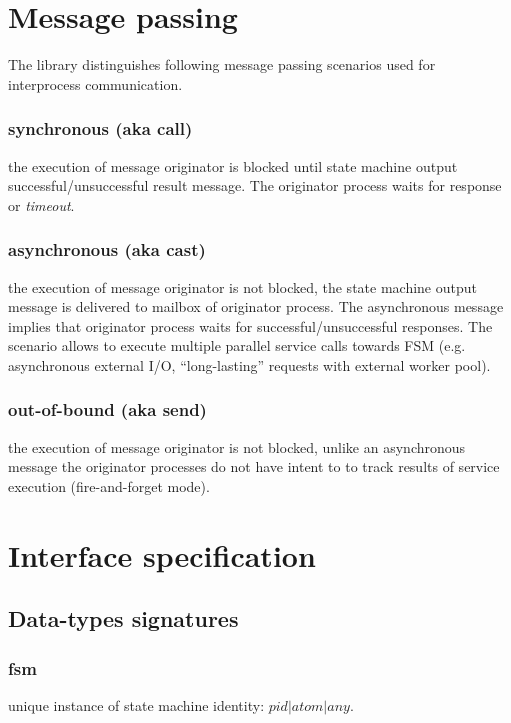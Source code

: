\documentclass{report}
\begin{document}
\section{Message passing}
	The library distinguishes following message passing scenarios used for 
	interprocess communication. 

\subsubsection{synchronous (aka call)}
	the execution of message originator is blocked until state machine output 
	successful/unsuccessful result message. The originator process  waits for 
	response or \emph{timeout}. 	
   
\subsubsection{asynchronous (aka cast)}
	the execution of message originator is not blocked, the state machine output
	message is delivered to mailbox of originator process. The asynchronous message
	implies that originator process waits for successful/unsuccessful responses. 
	The scenario allows to execute multiple parallel service calls towards FSM 
	(e.g. asynchronous external I/O, ``long-lasting'' requests with external 
	worker pool).
 	
\subsubsection{out-of-bound (aka send)}
	the execution of message originator is not blocked, unlike an asynchronous 
	message the originator processes do not have intent to to track results of 
	service execution (fire-and-forget mode). 

	
\section{Interface specification}

\subsection{Data-types signatures}

\subsubsection{fsm}
	unique instance of state machine identity: $ pid | atom | any$. 
\end{document}

